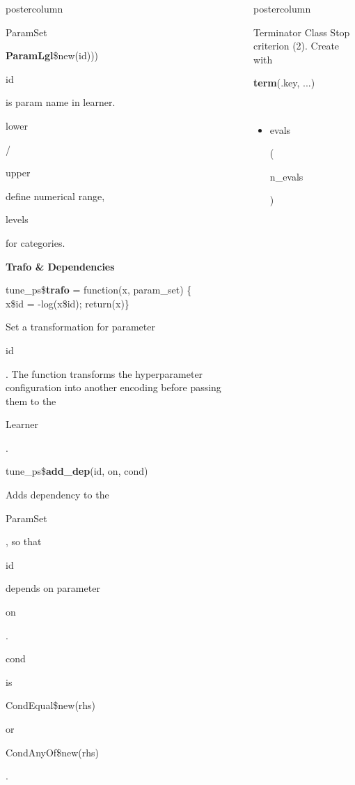 \documentclass{beamer}
\newlength{\columnheight} %
\newcommand{\codeinline}[1]{\begin{codeboxinline}#1\end{codeboxinline}}
\newcommand{\sectionheading}[1]{{\color{mlrblue}\large\raggedright\textbf{#1}}\vspace{1em}}
\begin{document}
\begin{frame}[fragile]{}
\begin{columns}
\begin{column}{.245\textwidth}
\begin{beamercolorbox}[center]{postercolumn}
\begin{minipage}{.98\textwidth}
{\begin{myblock}{ParamSet}
\begin{codeboxmultiline}[width=20.75cm]
								\hspace*{1ex}\textbf{ParamLgl}\$new(id)))
							\end{codeboxmultiline}
                            \codeinline{id} is param name in learner. 
                            \codeinline{lower}/\codeinline{upper} define 
                            numerical range, \codeinline{levels} for categories.
                            \vspace{1em}
                            \\ 
                            \sectionheading{Trafo  \& Dependencies}
							\begin{codeboxmultiline}[width=25.5cm]
								tune\_ps\$\textbf{trafo} = function(x, param\_set) \{\\
								\hspace*{1ex}x\$id = -log(x\$id); return(x)\}      
							\end{codeboxmultiline}
							Set a transformation for parameter \codeinline{id}. 
							The function transforms the hyperparameter configuration into another encoding 
							before passing them to the \codeinline{Learner}.
							\\
							\begin{codebox}
								tune\_ps\$\textbf{add\_dep}(id, on, cond)
							\end{codebox}
							Adds dependency to the \codeinline{ParamSet}, 
							so that \codeinline{id} depends on parameter \codeinline{on}.
							\codeinline{cond} is \codeinline{CondEqual\$new(rhs)} or \codeinline{CondAnyOf\$new(rhs)}.
						\end{myblock}
						\vfill}
				\end{minipage}
			\end{beamercolorbox}
		\end{column}
		\begin{column}{.245\textwidth}
			\begin{beamercolorbox}[center]{postercolumn}
				\begin{minipage}{.98\textwidth}
					\parbox[t][\columnheight]{\textwidth}{
						\begin{myblock}{Terminator Class}
							Stop criterion (2). Create with \codeinline{\textbf{term}(.key, ...)}
							\\
							\begin{itemize}
                                \item \codeinline{evals}
                                (\codeinline{n\_evals})\\

\end{itemize}
\end{myblock}}
\end{minipage}
\end{beamercolorbox}
\end{column}
\end{columns}
\end{frame}
\end{document}
